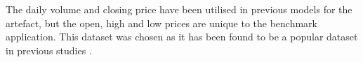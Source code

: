 The daily volume and closing price have been utilised in previous models for the artefact,
but the open, high and low prices are unique to the benchmark application. This dataset was
chosen as it has been found to be a popular dataset in previous studies \parencite{fitriyaningsih2019implementation,THAKKAR2020106684, hu_tang_zhang_wang_2018}.